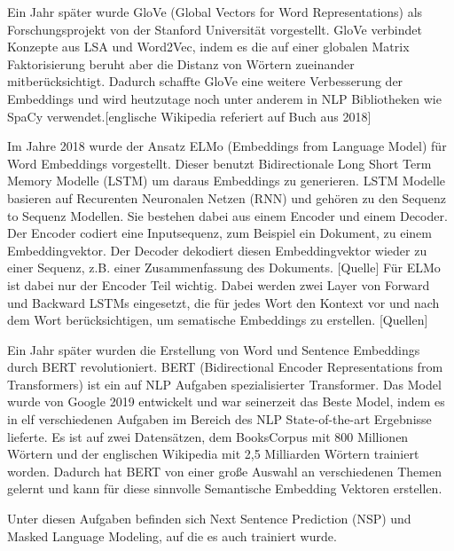 Ein Jahr später wurde GloVe (Global Vectors for Word Representations) als Forschungsprojekt von der Stanford Universität vorgestellt.
GloVe verbindet Konzepte aus LSA und Word2Vec, indem es die auf einer globalen Matrix Faktorisierung beruht aber die Distanz von Wörtern zueinander mitberücksichtigt.
Dadurch schaffte GloVe eine weitere Verbesserung der Embeddings und wird heutzutage noch unter anderem in NLP Bibliotheken wie SpaCy verwendet.[englische Wikipedia referiert auf Buch aus 2018]

Im Jahre 2018 wurde der Ansatz ELMo (Embeddings from Language Model) für Word Embeddings vorgestellt.
Dieser benutzt Bidirectionale Long Short Term Memory Modelle (LSTM) um daraus Embeddings zu generieren.
LSTM Modelle basieren auf Recurenten Neuronalen Netzen (RNN) und gehören zu den Sequenz to Sequenz Modellen. 
Sie bestehen dabei aus einem Encoder und einem Decoder.
Der Encoder codiert eine Inputsequenz, zum Beispiel ein Dokument, zu einem Embeddingvektor. 
Der Decoder dekodiert diesen Embeddingvektor wieder zu einer Sequenz, z.B. einer Zusammenfassung des Dokuments. [Quelle]
Für ELMo ist dabei nur der Encoder Teil wichtig.
Dabei werden zwei Layer von Forward und Backward LSTMs eingesetzt, die für jedes Wort den Kontext vor und nach dem Wort berücksichtigen, um sematische Embeddings zu erstellen. [Quellen]

Ein Jahr später wurden die Erstellung von Word und Sentence Embeddings durch BERT revolutioniert.
BERT (Bidirectional Encoder Representations from Transformers) \cite{devlin2019} ist ein auf NLP Aufgaben spezialisierter Transformer.
Das Model wurde von Google 2019 entwickelt und war seinerzeit das Beste Model, indem es in elf verschiedenen Aufgaben im Bereich des NLP State-of-the-art Ergebnisse lieferte.
Es ist auf zwei Datensätzen, dem BooksCorpus mit 800 Millionen Wörtern und der englischen Wikipedia mit 2,5 Milliarden Wörtern trainiert worden. \cite{devlin2019}
Dadurch hat BERT von einer große Auswahl an verschiedenen Themen gelernt und kann für diese sinnvolle Semantische Embedding Vektoren erstellen.













Unter diesen Aufgaben befinden sich Next Sentence Prediction (NSP) und Masked Language Modeling, auf die es auch trainiert wurde.



